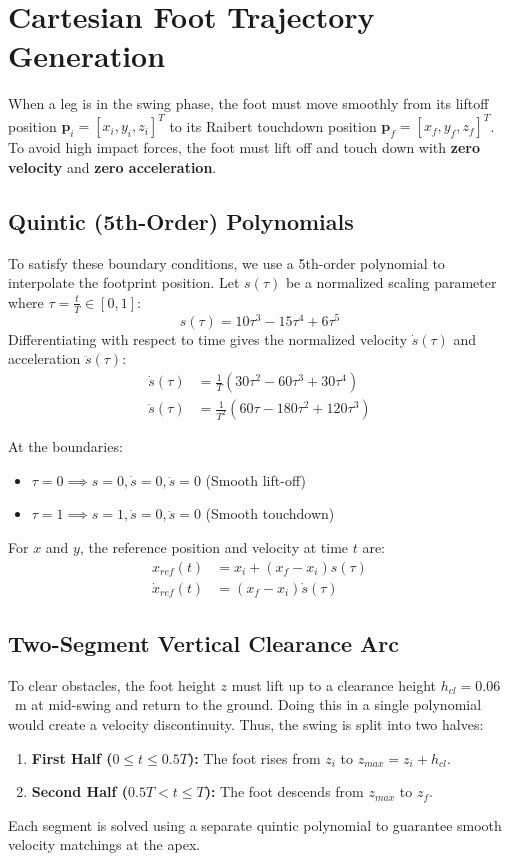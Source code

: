 \documentclass[11pt,a4paper]{article}
\begin{document}
\section{Cartesian Foot Trajectory Generation}
When a leg is in the swing phase, the foot must move smoothly from its liftoff position $\mathbf{p}_i = [x_i, y_i, z_i]^T$ to its Raibert touchdown position $\mathbf{p}_f = [x_f, y_f, z_f]^T$. To avoid high impact forces, the foot must lift off and touch down with \textbf{zero velocity} and \textbf{zero acceleration}.

\subsection{Quintic (5th-Order) Polynomials}
To satisfy these boundary conditions, we use a 5th-order polynomial to interpolate the footprint position. Let $s(\tau)$ be a normalized scaling parameter where $\tau = \frac{t}{T} \in [0, 1]$:
\begin{equation}
s(\tau) = 10\tau^3 - 15\tau^4 + 6\tau^5
\end{equation}
Differentiating with respect to time gives the normalized velocity $\dot{s}(\tau)$ and acceleration $\ddot{s}(\tau)$:
\begin{align}
\dot{s}(\tau) &= \frac{1}{T} (30\tau^2 - 60\tau^3 + 30\tau^4) \\
\ddot{s}(\tau) &= \frac{1}{T^2} (60\tau - 180\tau^2 + 120\tau^3)
\end{align}

At the boundaries:
\begin{itemize}
    \item $\tau = 0 \implies s = 0, \dot{s} = 0, \ddot{s} = 0$ (Smooth lift-off)
    \item $\tau = 1 \implies s = 1, \dot{s} = 0, \ddot{s} = 0$ (Smooth touchdown)
\end{itemize}

For $x$ and $y$, the reference position and velocity at time $t$ are:
\begin{align}
x_{ref}(t) &= x_i + (x_f - x_i) s(\tau) \\
\dot{x}_{ref}(t) &= (x_f - x_i) \dot{s}(\tau)
\end{align}

\subsection{Two-Segment Vertical Clearance Arc}
To clear obstacles, the foot height $z$ must lift up to a clearance height $h_{cl} = 0.06$~m at mid-swing and return to the ground. Doing this in a single polynomial would create a velocity discontinuity. Thus, the swing is split into two halves:
\begin{enumerate}
    \item \textbf{First Half ($0 \le t \le 0.5 T$):} The foot rises from $z_i$ to $z_{max} = z_i + h_{cl}$.
    \item \textbf{Second Half ($0.5 T < t \le T$):} The foot descends from $z_{max}$ to $z_f$.
\end{enumerate}
Each segment is solved using a separate quintic polynomial to guarantee smooth velocity matchings at the apex.
\end{document}
